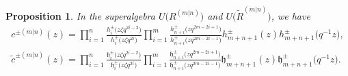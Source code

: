 \documentclass[10pt,a4paper]{amsart}
\numberwithin{equation}{section}
\newtheorem{Proposition}[Theorem]{Proposition}
 { \theoremstyle{definition}
\newtheorem{Definition}[Theorem]{Definition}
\newtheorem{Note}[Theorem]{Note}
\newtheorem{Example}[Theorem]{Example}
\newtheorem{Remark}[Theorem]{Remark} }
\begin{document}
\begin{Proposition}\label{pr5}
In the superalgebra $U\bigl(R^{(m|n)}\bigr)$ and $U\bigl(\widetilde{R}^{(m|n)}\bigr)$, we have
\begin{gather*}
c^{\pm(m|n)}(z)=\prod\limits_{i=1}^n\frac{h_i^{\pm}\bigl(z\zeta q^{2i-2}\bigr)}{h_i^{\pm}\bigl(z\zeta q^{2i}\bigr)}\prod\limits_{i=1}^m\frac{h_{n+i}^{\pm}\bigl(z q^{2m-2i+1}\bigr)}{h_{n+i}^{\pm}\bigl(zq^{2m-2i-1}\bigr)}h_{m+n+1}^{\pm}(z)h_{m+n+1}^{\pm}\bigl(q^{-1}z\bigr),\\
\widetilde{c}^{\pm(m|n)}(z)=\prod\limits_{i=1}^n\frac{\mathfrak{h}_i^{\pm}\bigl(z\zeta q^{2i-2}\bigr)}{\mathfrak{h}_i^{\pm}\bigl(z\zeta q^{2i}\bigr)}\prod\limits_{i=1}^m\frac{\mathfrak{h}_{n+i}^{\pm}\bigl(z q^{2m-2i+1}\bigr)}{\mathfrak{h}_{n+i}^{\pm}\bigl(zq^{2m-2i-1}\bigr)}\mathfrak{h}_{m+n+1}^{\pm}(z)\mathfrak{h}_{m+n+1}^{\pm}\bigl(q^{-1}z\bigr).
\end{gather*}
\end{Proposition}
\end{document}
